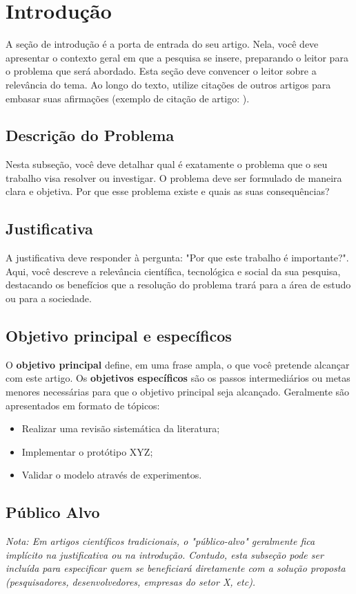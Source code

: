 \section{Introdução}
\label{sec:introducao}

A seção de introdução é a porta de entrada do seu artigo. Nela, você deve apresentar o contexto geral em que a pesquisa se insere, preparando o leitor para o problema que será abordado. Esta seção deve convencer o leitor sobre a relevância do tema. Ao longo do texto, utilize citações de outros artigos para embasar suas afirmações (exemplo de citação de artigo: \cite{artigo_exemplo}).

\subsection{Descrição do Problema}
Nesta subseção, você deve detalhar qual é exatamente o problema que o seu trabalho visa resolver ou investigar. O problema deve ser formulado de maneira clara e objetiva. Por que esse problema existe e quais as suas consequências?

\subsection{Justificativa}
A justificativa deve responder à pergunta: "Por que este trabalho é importante?". Aqui, você descreve a relevância científica, tecnológica e social da sua pesquisa, destacando os benefícios que a resolução do problema trará para a área de estudo ou para a sociedade.

\subsection{Objetivo principal e específicos}
O \textbf{objetivo principal} define, em uma frase ampla, o que você pretende alcançar com este artigo. 
Os \textbf{objetivos específicos} são os passos intermediários ou metas menores necessárias para que o objetivo principal seja alcançado. Geralmente são apresentados em formato de tópicos:
\begin{itemize}
    \item Realizar uma revisão sistemática da literatura;
    \item Implementar o protótipo XYZ;
    \item Validar o modelo através de experimentos.
\end{itemize}

\subsection{Público Alvo}
\textit{Nota: Em artigos científicos tradicionais, o "público-alvo" geralmente fica implícito na justificativa ou na introdução. Contudo,  esta subseção pode ser incluída para especificar quem se beneficiará diretamente com a solução proposta (pesquisadores, desenvolvedores, empresas do setor X, etc).}

